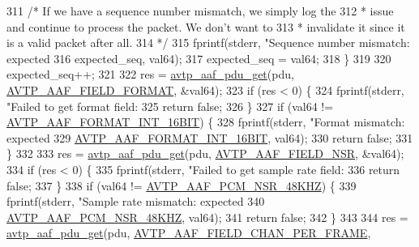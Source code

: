 \begin{DoxyCode}
{{{{{{{{{{{311         \textcolor{comment}{/* If we have a sequence number mismatch, we simply log the}
312 \textcolor{comment}{         * issue and continue to process the packet. We don't want to}
313 \textcolor{comment}{         * invalidate it since it is a valid packet after all.}
314 \textcolor{comment}{         */}
315         fprintf(stderr, \textcolor{stringliteral}{"Sequence number mismatch: expected %
316                             expected\_seq, val64);
317         expected\_seq = val64;
318     \}
319 
320     expected\_seq++;
321 
322     res = \hyperlink{avtp__aaf_8h_acc4c927b036e22def8e6b6beb3ac6026}{avtp\_aaf\_pdu\_get}(pdu, \hyperlink{avtp__aaf_8h_a7eaee6c1ebc806c0401dbe7b14cd22dbad867950e53bb3b120e37a7598fcd1fb4}{AVTP\_AAF\_FIELD\_FORMAT}, &val64);
323     \textcolor{keywordflow}{if} (res < 0) \{
324         fprintf(stderr, \textcolor{stringliteral}{"Failed to get format field: %
325         \textcolor{keywordflow}{return} \textcolor{keyword}{false};
326     \}
327     \textcolor{keywordflow}{if} (val64 != \hyperlink{avtp__aaf_8h_a9eba80944b5c061b495ca045ef887799}{AVTP\_AAF\_FORMAT\_INT\_16BIT}) \{
328         fprintf(stderr, \textcolor{stringliteral}{"Format mismatch: expected %
329                     \hyperlink{avtp__aaf_8h_a9eba80944b5c061b495ca045ef887799}{AVTP\_AAF\_FORMAT\_INT\_16BIT}, val64);
330         \textcolor{keywordflow}{return} \textcolor{keyword}{false};
331     \}
332 
333     res = \hyperlink{avtp__aaf_8h_acc4c927b036e22def8e6b6beb3ac6026}{avtp\_aaf\_pdu\_get}(pdu, \hyperlink{avtp__aaf_8h_a7eaee6c1ebc806c0401dbe7b14cd22dbaa7c9036133950993bf1311879c665634}{AVTP\_AAF\_FIELD\_NSR}, &val64);
334     \textcolor{keywordflow}{if} (res < 0) \{
335         fprintf(stderr, \textcolor{stringliteral}{"Failed to get sample rate field: %
336         \textcolor{keywordflow}{return} \textcolor{keyword}{false};
337     \}
338     \textcolor{keywordflow}{if} (val64 != \hyperlink{avtp__aaf_8h_a328e6cfab35eba3db6e5659df3cdef38}{AVTP\_AAF\_PCM\_NSR\_48KHZ}) \{
339         fprintf(stderr, \textcolor{stringliteral}{"Sample rate mismatch: expected %
340                         \hyperlink{avtp__aaf_8h_a328e6cfab35eba3db6e5659df3cdef38}{AVTP\_AAF\_PCM\_NSR\_48KHZ}, val64);
341         \textcolor{keywordflow}{return} \textcolor{keyword}{false};
342     \}
343 
344     res = \hyperlink{avtp__aaf_8h_acc4c927b036e22def8e6b6beb3ac6026}{avtp\_aaf\_pdu\_get}(pdu, \hyperlink{avtp__aaf_8h_a7eaee6c1ebc806c0401dbe7b14cd22dbab6202d8ac4e1b7e819e5adb08b90a346}{AVTP\_AAF\_FIELD\_CHAN\_PER\_FRAME},
}}}}}}}}}}}}}}}}
\end{DoxyCode}
